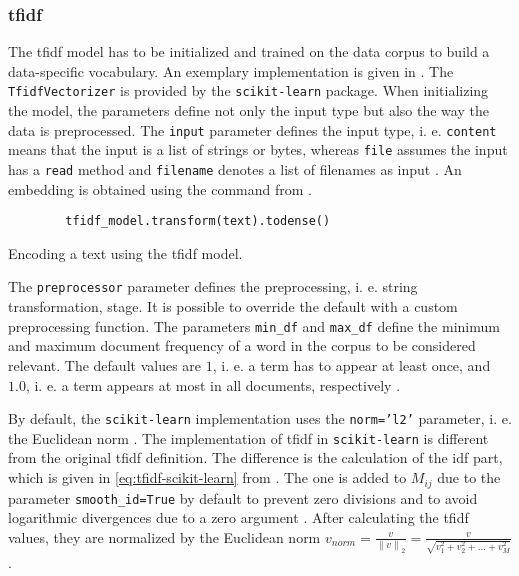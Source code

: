 \subsubsection*{\ac{tfidf}}\label{subsubsec:impl-tfidf}

The \ac{tfidf} model has to be initialized and trained on the data corpus to build a data-specific vocabulary.
An exemplary implementation is given in .
The \texttt{TfidfVectorizer} is provided by the \texttt{scikit-learn} package.
When initializing the model, the parameters define not only the input type but also the way the data is preprocessed.
The \texttt{input} parameter defines the input type, i. e. \texttt{content} means that the input is a list of strings or bytes, 
whereas \texttt{file} assumes the input has a \texttt{read} method and \texttt{filename} denotes a list of filenames as input \cite{tfidf-scikit-learn}.
An embedding is obtained using the command from .

\begin{listing}[htp]
    \begin{verbatim}
        tfidf_model.transform(text).todense()
    \end{verbatim}
    \caption[Encoding a text using the \ac{tfidf} model]{Encoding a text using the \ac{tfidf} model.
    }
    \label{lst:encode-tfidf}
\end{listing}

The \texttt{preprocessor} parameter defines the preprocessing, i. e. string transformation, stage.
It is possible to override the default with a custom preprocessing function.
The parameters \texttt{min\_df} and \texttt{max\_df} define the minimum and maximum document frequency of a word in the corpus to be considered relevant.
The default values are $1$, i. e. a term has to appear at least once, and $1.0$, i. e. a term appears at most in all documents, respectively \cite{tfidf-scikit-learn}.

By default, the \texttt{scikit-learn} implementation uses the \texttt{norm='l2'} parameter, i. e. the Euclidean norm \cite{tfidf-scikit-learn}.
The implementation of \ac{tfidf} in \texttt{scikit-learn} is different from the original \ac{tfidf} definition.
The difference is the calculation of the \ac{idf} part, which is given in \autoref{eq:tfidf-scikit-learn} from \cite{tfidf-scikit-learn}.
The one is added to $M_{ij}$ due to the parameter \texttt{smooth\_id=True} by default to prevent zero divisions \cite{tfidf-scikit-learn}
and to avoid logarithmic divergences due to a zero argument \cite{glove2014}.
After calculating the \ac{tfidf} values, they are normalized by the Euclidean norm 
$v_{norm} = \frac{v}{\left\| v \right\|_{2}} = \frac{v}{\sqrt{v_1^{2} + v_2^{2} + ... + v_M^{2}}}$.

